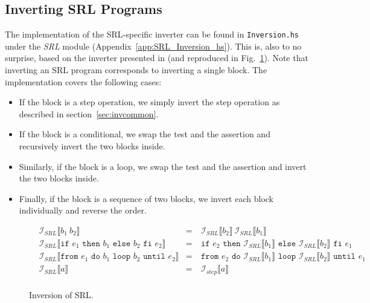 \subsection{Inverting SRL Programs}

The implementation of the SRL-specific inverter can be found in \texttt{Inversion.hs} under the \textit{SRL} module (Appendix~\ref{app:SRL_Inversion_hs}). This is, also to no surprise, based on the inverter presented in \cite[Fig.~18]{REV} (and reproduced in Fig.~\ref{fig:inversion_srl}). Note that inverting an SRL program corresponds to inverting a single block. The implementation covers the following cases:

\begin{itemize}
  \item If the block is a step operation, we simply invert the step operation as described in section~\ref{sec:invcommon}.

  \item If the block is a conditional, we swap the test and the assertion and recursively invert the two blocks inside.

  \item Similarly, if the block is a loop, we swap the test and the assertion and invert the two blocks inside.

  \item Finally, if the block is a sequence of two blocks, we invert each block individually and reverse the order.
\end{itemize}

\begin{figure}
  $$\begin{aligned}
    & \mathcal{I}_{SRL}\llbracket b_1\ b_2\rrbracket & =\ & \mathcal{I}_{SRL}\llbracket b_2\rrbracket\ \mathcal{I}_{SRL}\llbracket b_1\rrbracket\\
    & \mathcal{I}_{SRL}\llbracket\texttt{if }e_1\texttt{ then }b_1\texttt{ else }b_2\texttt{ fi }e_2\rrbracket & =\ &
      \texttt{if }e_2\texttt{ then }\mathcal{I}_{SRL}\llbracket b_1\rrbracket\texttt{ else }\mathcal{I}_{SRL}\llbracket b_2\rrbracket\texttt{ fi }e_1\\
    & \mathcal{I}_{SRL}\llbracket\texttt{from }e_1\texttt{ do }b_1\texttt{ loop }b_2\texttt{ until }e_2\rrbracket & =\ &
      \texttt{from }e_2\texttt{ do }\mathcal{I}_{SRL}\llbracket b_1\rrbracket\texttt{ loop }\mathcal{I}_{SRL}\llbracket b_2\rrbracket\texttt{ until }e_1\\
    & \mathcal{I}_{SRL}\llbracket a\rrbracket & =\ & \mathcal{I}_{step}\llbracket a\rrbracket\\
  \end{aligned}$$
  \caption{Inversion of SRL.}
  \label{fig:inversion_srl}
\end{figure}

